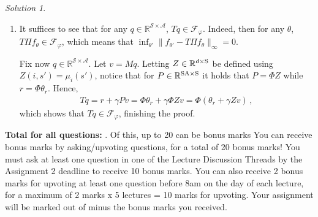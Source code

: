 \documentclass{article}
\renewcommand{\phi}{\varphi}
\newcommand{\R}{\mathbb{R}}
\DeclareMathOperator*{\1}{\mathbbm{1}}
\newcommand{\cF}{\mathcal{F}}
\newcommand{\0}{\mathbf{0}}
\newcounter{DocPoints} %
\theoremstyle{definition}
\newtheorem{question}{Question}
\theoremstyle{remark}
\newtheorem*{solution*}{Solution}
\newcommand{\cS}{\mathcal{S}}
\newcommand{\cA}{\mathcal{A}}
\begin{document}
\begin{solution*}
\begin{enumerate}
\item 
It suffices to see that for any $q\in \R^{\cS \times \cA}$, $T q\in \cF_{\phi}$. Indeed, then for any $\theta$, $T\Pi f_\theta\in \cF_{\phi}$, which means that $\inf_{\theta'} \| f_{\theta'} - T \Pi f_{\theta} \|_\infty=0$.

Fix now $q\in \R^{\cS\times \cA}$. Let $v = Mq$.
Letting $Z\in \R^{d\times \nS}$ be defined using $Z(i,s') = \mu_i(s')$, notice that 
for $P\in \R^{\nS \nA \times \nS}$ it holds that 
$P =\Phi Z$ while $r = \Phi \theta_r$.
Hence,
\begin{align*}
T q = r + \gamma P v  =\Phi \theta_r + \gamma \Phi Z v = \Phi (\theta_r + \gamma Z v)\,,
\end{align*}
which shows that $Tq \in \cF_{\phi}$, finishing the proof.
\end{enumerate}
\end{solution*}



\bigskip
\bigskip

\noindent
\textbf{
Total for all questions: }.
Of this, up to 20 can be bonus marks You can receive bonus marks by asking/upvoting questions, for a total of 20 bonus marks! 
You must ask at least one question in one of the Lecture Discussion Threads by the Assignment 2 deadline to receive 10 bonus marks. 
You can also receive 2 bonus marks for upvoting at least one question before 8am on the day of each lecture, for a maximum of 2 marks x 5 lectures = 10 marks for upvoting.
Your assignment will be marked out of  minus the bonus marks you received.
\end{document}
